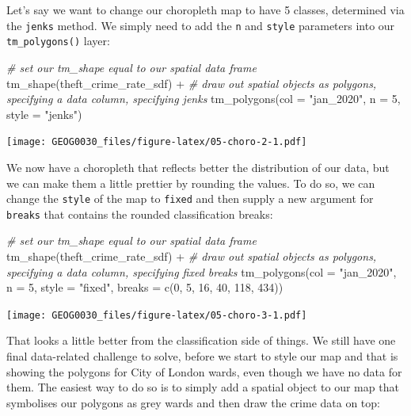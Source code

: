 \documentclass[
]{book}
\newenvironment{Shaded}{\begin{snugshade}}{\end{snugshade}}
\newcommand{\AttributeTok}[1]{\textcolor[rgb]{0.77,0.63,0.00}{#1}}
\newcommand{\CommentTok}[1]{\textcolor[rgb]{0.56,0.35,0.01}{\textit{#1}}}
\newcommand{\DecValTok}[1]{\textcolor[rgb]{0.00,0.00,0.81}{#1}}
\newcommand{\FunctionTok}[1]{\textcolor[rgb]{0.00,0.00,0.00}{#1}}
\newcommand{\NormalTok}[1]{#1}
\newcommand{\SpecialCharTok}[1]{\textcolor[rgb]{0.00,0.00,0.00}{#1}}
\newcommand{\StringTok}[1]{\textcolor[rgb]{0.31,0.60,0.02}{#1}}
\begin{document}
Let's say we want to change our choropleth map to have 5 classes, determined via the \texttt{jenks} method. We simply need to add the \texttt{n} and \texttt{style} parameters into our \texttt{tm\_polygons()} layer:

\begin{Shaded}
\begin{Highlighting}[]
\CommentTok{\# set our tm\_shape equal to our spatial data frame}
\FunctionTok{tm\_shape}\NormalTok{(theft\_crime\_rate\_sdf) }\SpecialCharTok{+} 
  \CommentTok{\# draw out spatial objects as polygons, specifying a data column, specifying jenks}
  \FunctionTok{tm\_polygons}\NormalTok{(}\AttributeTok{col =} \StringTok{"jan\_2020"}\NormalTok{, }\AttributeTok{n =} \DecValTok{5}\NormalTok{, }\AttributeTok{style =} \StringTok{"jenks"}\NormalTok{)}
\end{Highlighting}
\end{Shaded}

\texttt{[image: GEOG0030\_files/figure-latex/05-choro-2-1.pdf]}

We now have a choropleth that reflects better the distribution of our data, but we can make them a little prettier by rounding the values. To do so, we can change the \texttt{style} of the map to \texttt{fixed} and then supply a new argument for \texttt{breaks} that contains the rounded classification breaks:

\begin{Shaded}
\begin{Highlighting}[]
\CommentTok{\# set our tm\_shape equal to our spatial data frame}
\FunctionTok{tm\_shape}\NormalTok{(theft\_crime\_rate\_sdf) }\SpecialCharTok{+} 
  \CommentTok{\# draw out spatial objects as polygons, specifying a data column, specifying fixed breaks}
  \FunctionTok{tm\_polygons}\NormalTok{(}\AttributeTok{col =} \StringTok{"jan\_2020"}\NormalTok{, }\AttributeTok{n =} \DecValTok{5}\NormalTok{, }\AttributeTok{style =} \StringTok{"fixed"}\NormalTok{, }\AttributeTok{breaks =} \FunctionTok{c}\NormalTok{(}\DecValTok{0}\NormalTok{, }\DecValTok{5}\NormalTok{, }\DecValTok{16}\NormalTok{, }\DecValTok{40}\NormalTok{, }\DecValTok{118}\NormalTok{, }\DecValTok{434}\NormalTok{))}
\end{Highlighting}
\end{Shaded}

\texttt{[image: GEOG0030\_files/figure-latex/05-choro-3-1.pdf]}

That looks a little better from the classification side of things. We still have one final data-related challenge to solve, before we start to style our map and that is showing the polygons for City of London wards, even though we have no data for them. The easiest way to do so is to simply add a spatial object to our map that symbolises our polygons as grey wards and then draw the crime data on top:
\end{document}
